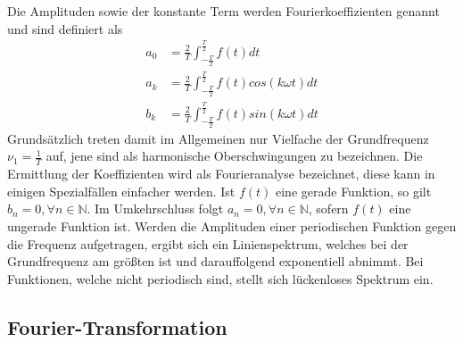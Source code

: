 Die Amplituden sowie der konstante Term werden Fourierkoeffizienten genannt und 
sind definiert als 
\begin{align}
    a_0 &= \frac{2}{T} \int_{-\frac{T}{2}}^{\frac{T}{2}} f(t) dt \label{eqn:4.1} \\
    a_k &= \frac{2}{T} \int_{-\frac{T}{2}}^{\frac{T}{2}} f(t) cos(k \omega t) dt \label{eqn:4.2} \\
    b_k &= \frac{2}{T} \int_{-\frac{T}{2}}^{\frac{T}{2}} f(t) sin(k \omega t) dt \label{eqn:4.3}
\end{align}
Grundsätzlich treten damit im Allgemeinen nur Vielfache der Grundfrequenz 
$\nu_1 = \frac{1}{T}$ auf, jene sind als harmonische Oberschwingungen zu bezeichnen.
Die Ermittlung der Koeffizienten wird als Fourieranalyse bezeichnet, diese kann 
in einigen Spezialfällen einfacher werden. Ist $f(t)$ eine gerade Funktion, so 
gilt $b_n = 0, \forall n \in \mathbb{N}$. Im Umkehrschluss folgt 
$a_n = 0, \forall n \in \mathbb{N}$, sofern $f(t)$ eine ungerade Funktion ist.
Werden die Amplituden einer periodischen Funktion gegen die Frequenz aufgetragen,
ergibt sich ein Linienspektrum, welches bei der Grundfrequenz am größten ist
und darauffolgend exponentiell abnimmt. Bei Funktionen, welche nicht periodisch 
sind, stellt sich lückenloses Spektrum ein.

\subsection{Fourier-Transformation}
